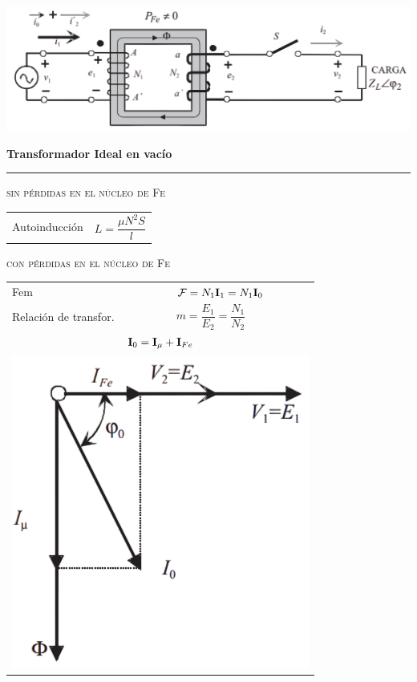 \documentclass[11pt,a4paper]{article}
\newcommand{\fasor}[1]{\uppercase{\textbf{#1}}}
\newcommand{\subtitulo}[1]{
	\textbf{#1} \\ \vspace{.1cm} {\color{gray} \hrule}
}
\newcommand{\subsubtitulo}[1]{
	\begin{flushleft}
		\vspace{.1cm}
		\textsc{#1}
		\vspace{.1cm}
	\end{flushleft}
}
\begin{document}
	\begin{cajita}
		\centering
		
		\includegraphics[width = .8\linewidth]{carga-trafo}
		\begin{multicols}{2}
		
			\begin{center}
				\subtitulo{Transformador Ideal \textnormal{en vacío} \vspace{.1cm}} 
			\end{center}
			
			\subsubtitulo{sin pérdidas en el núcleo de Fe} 
			
			\begin{tabular}{l l}
				Autoinducción & $L = \dfrac{\mu N^2 S}{l}$ \\
			\end{tabular}
		
			\subsubtitulo{con pérdidas en el núcleo de Fe}
			
			\begin{tabular}{l l}
				Fem & $\mathcal{F} = N_1  \fasor{i}_1  = N_1  \fasor{i}_0$\\
				Relación de transfor. & $m = \dfrac{E_1}{E_2} = \dfrac{N_1}{N_2}$ \\
				\multicolumn{2}{c}{$ \fasor{i}_0 = \fasor{i}_\mu + \fasor{i}_{Fe} $} \vspace{.1cm} \\ 
				\multicolumn{2}{c}{\includegraphics[width = .5\linewidth]{vacio-fasores}} \\
			\end{tabular} 
		

\end{multicols}
\end{cajita}
\end{document}
